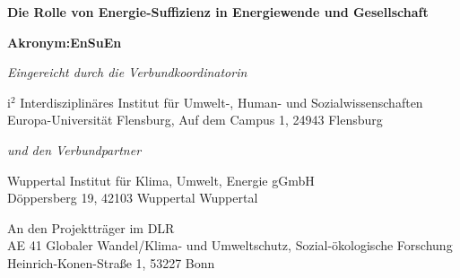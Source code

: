 \begin{center}
\vspace{0.5cm}

{\Huge
\textbf{\textsf{Die Rolle von Energie-Suffizienz in Energiewende und Gesellschaft\\
}}

\textbf{\textsf{}}
}

{\Huge
\textbf{\textsf{Akronym:{EnSuEn}}}
}

\vspace{1cm}

\textit{Eingereicht durch die Verbundkoordinatorin}

{\parskip 0pt
i$^{2}$ Interdisziplinäres Institut für Umwelt-, Human- und Sozialwissenschaften\\
Europa-Universität Flensburg, Auf dem Campus 1, 24943 Flensburg}

\vspace{0.3cm}

\textit{und den Verbundpartner}

{\parskip 0pt
Wuppertal Institut für Klima, Umwelt, Energie gGmbH\\
Döppersberg 19, 42103 Wuppertal Wuppertal}

\vspace{0.5cm}

An den Projektträger im DLR \\
AE 41 Globaler Wandel/Klima- und Umweltschutz, Sozial-ökologische Forschung \\
Heinrich-Konen-Straße 1, 53227 Bonn


\end{center}

\clearpage